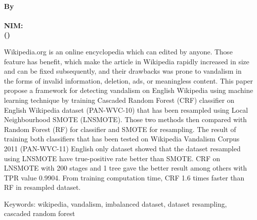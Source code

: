 \begin{center}
\textbf{\large
	\MakeUppercase{\mytitle{}} \\
	\bigskip
	\textnormal{By} \\
	\myname{} \\
	NIM: \mysid{} \\
	(\mydept{}) \\
}
\end{center}

\bigskip
\bigskip
\bigskip

Wikipedia.org is an online encyclopedia which can edited by anyone.
Those feature has benefit, which make the article in Wikipedia rapidly
increased in size and can be fixed subsequently, and their drawbacks was prone
to vandalism in the forms of invalid information, deletion, ads, or meaningless
content.
This paper propose a framework for detecting vandalism on English Wikipedia
using machine learning technique by training Cascaded Random Forest (CRF)
classifier on English Wikipedia dataset (PAN-WVC-10) that has been resampled
using Local Neighbourhood SMOTE (LNSMOTE).
Those two methods then compared with Random Forest (RF) for classifier and
SMOTE for resampling.
The result of training both classifiers that has been tested on Wikipedia
Vandalism Corpus 2011 (PAN-WVC-11) English only dataset showed that the dataset
resampled using LNSMOTE have true-positive rate better than SMOTE.
CRF on LNSMOTE with 200 stages and 1 tree gave the better result among others
with TPR value 0.9904.
From training computation time, CRF 1.6 times faster than RF in resampled
dataset.

Keywords: wikipedia, vandalism, imbalanced dataset, dataset resampling,
cascaded random forest
